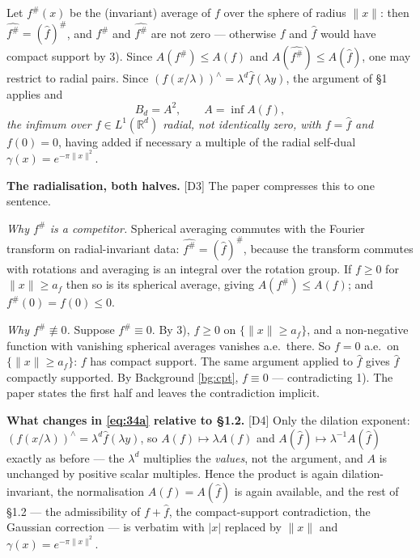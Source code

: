 \documentclass[11pt,reqno]{amsart}
\theoremstyle{plain}
\theoremstyle{definition}
\theoremstyle{remark}
\newcommand{\R}{\mathbb{R}}
\newcommand{\fh}{\widehat{f}}
\newcommand{\Ledger}[1]{{\scriptsize\textsf{[#1]}}}
\begin{document}
Let $f^\#(x)$ be the (invariant) average of $f$ over the sphere of radius $\|x\|$:
then $\widehat{f^\#}=(\fh)^\#$, and $f^\#$ and $\widehat{f^\#}$ are not zero ---
otherwise $f$ and $\fh$ would have compact support by 3). Since $A(f^\#)\le A(f)$ and
$A(\widehat{f^\#})\le A(\fh)$, one may restrict to radial pairs. Since
$(f(x/\lambda))^{\wedge}=\lambda^d\fh(\lambda y)$, the argument of \S1 applies and
\begin{equation}\label{eq:34a}
 B_d=A^2,\qquad A=\inf A(f),
\end{equation}
\emph{the infimum over $f\in L^1(\R^d)$ radial, not identically zero, with $f=\fh$ and
$f(0)=0$}, having added if necessary a multiple of the radial self-dual
$\gamma(x)=e^{-\pi\|x\|^2}$.

\begin{filled}
\textbf{The radialisation, both halves.} \Ledger{D3} The paper compresses this to one
sentence.

\emph{Why $f^\#$ is a competitor.} Spherical averaging commutes with the Fourier
transform on radial-invariant data: $\widehat{f^\#}=(\fh)^\#$, because the transform
commutes with rotations and averaging is an integral over the rotation group. If $f\ge
0$ for $\|x\|\ge a_f$ then so is its spherical average, giving $A(f^\#)\le A(f)$; and
$f^\#(0)=f(0)\le0$.

\emph{Why $f^\#\not\equiv0$.} Suppose $f^\#\equiv0$. By 3), $f\ge0$ on
$\{\|x\|\ge a_f\}$, and a non-negative function with vanishing spherical averages
vanishes a.e.\ there. So $f=0$ a.e.\ on $\{\|x\|\ge a_f\}$: $f$ has compact support.
The same argument applied to $\fh$ gives $\fh$ compactly supported. By Background
\ref{bg:cpt}, $f\equiv0$ --- contradicting 1). The paper states the first half and
leaves the contradiction implicit.
\end{filled}

\begin{expansion}
\textbf{What changes in \eqref{eq:34a} relative to \S1.2.} \Ledger{D4} Only the
dilation exponent: $(f(x/\lambda))^{\wedge}=\lambda^d\fh(\lambda y)$, so
$A(f)\mapsto\lambda A(f)$ and $A(\fh)\mapsto\lambda^{-1}A(\fh)$ exactly as before ---
the $\lambda^d$ multiplies the \emph{values}, not the argument, and $A$ is unchanged
by positive scalar multiples. Hence the product is again dilation-invariant, the
normalisation $A(f)=A(\fh)$ is again available, and the rest of \S1.2 --- the
admissibility of $f+\fh$, the compact-support contradiction, the Gaussian correction
--- is verbatim with $|x|$ replaced by $\|x\|$ and $\gamma(x)=e^{-\pi\|x\|^2}$.
\end{expansion}
\end{document}
